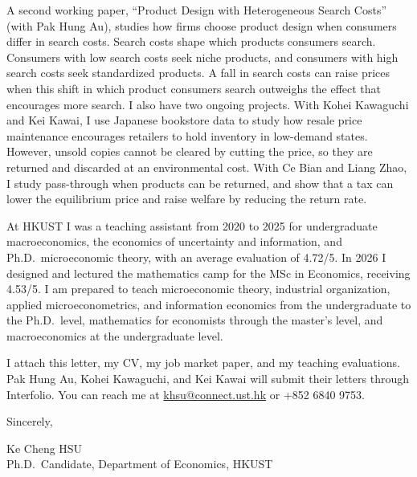 \documentclass[11pt]{article}
\begin{document}
A second working paper, ``Product Design with Heterogeneous Search Costs'' (with Pak Hung Au), studies how firms choose product design when consumers differ in search costs. Search costs shape which products consumers search. Consumers with low search costs seek niche products, and consumers with high search costs seek standardized products. A fall in search costs can raise prices when this shift in which product consumers search outweighs the effect that encourages more search. I also have two ongoing projects. With Kohei Kawaguchi and Kei Kawai, I use Japanese bookstore data to study how resale price maintenance encourages retailers to hold inventory in low-demand states. However, unsold copies cannot be cleared by cutting the price, so they are returned and discarded at an environmental cost. With Ce Bian and Liang Zhao, I study pass-through when products can be returned, and show that a tax can lower the equilibrium price and raise welfare by reducing the return rate.

At HKUST I was a teaching assistant from 2020 to 2025 for undergraduate macroeconomics, the economics of uncertainty and information, and Ph.D.\ microeconomic theory, with an average evaluation of 4.72/5. In 2026 I designed and lectured the mathematics camp for the MSc in Economics, receiving 4.53/5. I am prepared to teach microeconomic theory, industrial organization, applied microeconometrics, and information economics from the undergraduate to the Ph.D.\ level, mathematics for economists through the master's level, and macroeconomics at the undergraduate level.

I attach this letter, my CV, my job market paper, and my teaching evaluations. Pak Hung Au, Kohei Kawaguchi, and Kei Kawai will submit their letters through Interfolio. You can reach me at \href{mailto:khsu@connect.ust.hk}{khsu@connect.ust.hk} or +852 6840 9753.

\vspace{0.25em}
Sincerely,

\vspace{0.25em}
Ke Cheng HSU \\
Ph.D.\ Candidate, Department of Economics, HKUST
\end{document}
